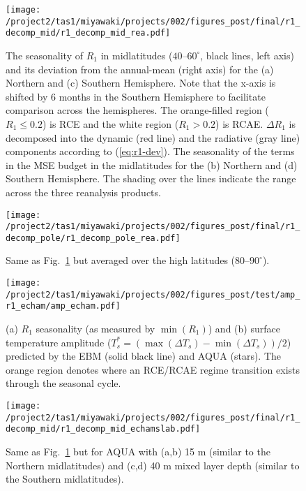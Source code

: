 \documentclass{ametsocV5}
\begin{document}
\begin{figure}[t]
  \noindent\texttt{[image: /project2/tas1/miyawaki/projects/002/figures\_post/final/r1\_decomp\_mid/r1\_decomp\_mid\_rea.pdf]}\\
  \caption{The seasonality of $R_{1}$ in midlatitudes ($40$--$60^{\circ}$, black lines, left axis) and its deviation from the annual-mean (right axis) for the (a) Northern and (c) Southern Hemisphere. Note that the x-axis is shifted by 6 months in the Southern Hemisphere to facilitate comparison across the hemispheres. The orange-filled region ($R_1 \le 0.2$) is RCE and the white region ($R_1>0.2$) is RCAE. $\Delta R_1$ is decomposed into the dynamic (red line) and the radiative (gray line) components according to (\ref{eq:r1-dev}). The seasonality of the terms in the MSE budget in the midlatitudes for the (b) Northern and (d) Southern Hemisphere. The shading over the lines indicate the range across the three reanalysis products.}
  \label{fig:rea-r1-decomp-mid}
\end{figure}

\begin{figure}[t]
  \noindent\texttt{[image: /project2/tas1/miyawaki/projects/002/figures\_post/final/r1\_decomp\_pole/r1\_decomp\_pole\_rea.pdf]}\\
  \caption{Same as Fig.~\ref{fig:rea-r1-decomp-mid} but averaged over the high latitudes ($80$--$90^{\circ}$).}
  \label{fig:rea-r1-decomp-pole}
\end{figure}

\begin{figure}
  \noindent\texttt{[image: /project2/tas1/miyawaki/projects/002/figures\_post/test/amp\_r1\_echam/amp\_echam.pdf]}\\
  \caption{(a) $R_1$ seasonality (as measured by $\min(R_1)$) and (b) surface temperature amplitude ($T_s^*=(\max(\Delta T_s)- \min(\Delta T_s))/2$) predicted by the EBM (solid black line) and AQUA (stars). The orange region denotes where an RCE/RCAE regime transition exists through the seasonal cycle.}
  \label{fig:amp-r1-echam}
\end{figure}

\begin{figure}[t]
    \noindent\texttt{[image: /project2/tas1/miyawaki/projects/002/figures\_post/final/r1\_decomp\_mid/r1\_decomp\_mid\_echamslab.pdf]}\\
    \caption{Same as Fig.~\ref{fig:rea-r1-decomp-mid} but for AQUA with (a,b) 15 m (similar to the Northern midlatitudes) and (c,d) 40 m mixed layer depth (similar to the Southern midlatitudes).}
\label{fig:echam-rce}
\end{figure}
\end{document}
